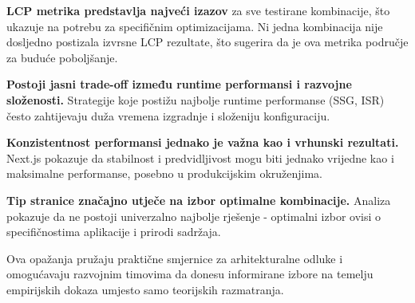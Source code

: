 \textbf{LCP metrika predstavlja najveći izazov} za sve testirane kombinacije, što ukazuje na potrebu za specifičnim optimizacijama. Ni jedna kombinacija nije dosljedno postizala izvrsne LCP rezultate, što sugerira da je ova metrika područje za buduće poboljšanje.

\textbf{Postoji jasni trade-off između runtime performansi i razvojne složenosti.} Strategije koje postižu najbolje runtime performanse (SSG, ISR) često zahtijevaju duža vremena izgradnje i složeniju konfiguraciju.

\textbf{Konzistentnost performansi jednako je važna kao i vrhunski rezultati.} Next.js pokazuje da stabilnost i predvidljivost mogu biti jednako vrijedne kao i maksimalne performanse, posebno u produkcijskim okruženjima.

\textbf{Tip stranice značajno utječe na izbor optimalne kombinacije.} Analiza pokazuje da ne postoji univerzalno najbolje rješenje - optimalni izbor ovisi o specifičnostima aplikacije i prirodi sadržaja.

Ova opažanja pružaju praktične smjernice za arhitekturalne odluke i omogućavaju razvojnim timovima da donesu informirane izbore na temelju empirijskih dokaza umjesto samo teorijskih razmatranja.
